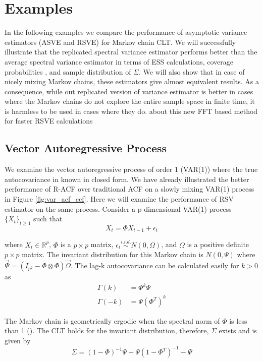 \documentclass[11pt]{article}
\theoremstyle{remark}
\begin{document}
\section{Examples} \label{sec:examples}

In the following examples we compare the performance of asymptotic variance estimators (ASVE and RSVE) for Markov chain CLT. We will successfully illustrate that the replicated spectral variance estimator performs better than the average spectral variance estimator in terms of ESS calculations, coverage probabilities , and sample distribution of $\Sigma$. We will also show that in case of nicely mixing Markov chains, these estimators give almost equivalent results. As a consequence, while out replicated version of variance estimator is better in cases where the Markov chains do not explore the entire sample space in finite time, it is harmless to be used in cases where they do.  
{\color{red}about this new FFT based method for faster RSVE calculations}

\subsection{Vector Autoregressive Process} \label{ex:var}

We examine the vector autoregressive process of order 1 (VAR(1)) where the true autocovariance in known in closed form. We have already illustrated the better performance of R-ACF over traditional ACF on a slowly mixing VAR(1) process in Figure \ref{fig:var_acf_ccf}. Here we will examine the performance of RSV estimator on the same process. Consider a p-dimensional VAR(1) process $\{X_t\}_{t \geq 1}$ such that
%
\[
X_t = \Phi X_{t-1} + \epsilon_t
\]

where $X_t \in \mathbb{R}^p$, $\Phi $ is a $p \times p $ matrix, $ \epsilon_t \overset{i.i.d.}{\sim} N(0, \Omega)$, and $\Omega$ is a positive definite $p \times p$ matrix. The invariant distribution for this Markov chain is $N(0, \Psi)$ where $\Vec{\Psi} = (I_{p^2} - \Phi \otimes \Phi)\Vec{\Omega}$. The lag-k autocovariance can be calculated easily for $k >0$ as
%
\begin{align*}
    \Gamma(k) &= \Phi^k\Psi\\
    \Gamma(-k) &= \Psi(\Phi^T)^k
\end{align*}

The Markov chain is geometrically ergodic when the spectral norm of $\Phi$ is less than 1 (\cite{10.2307/1427459}). The CLT holds for the invariant distribution, therefore, $\Sigma$ exists and is given by
%
\[
\Sigma = (1 - \Phi)^{-1}\Psi + \Psi(1 - \Phi^T)^{-1} - \Psi
\]
\end{document}

